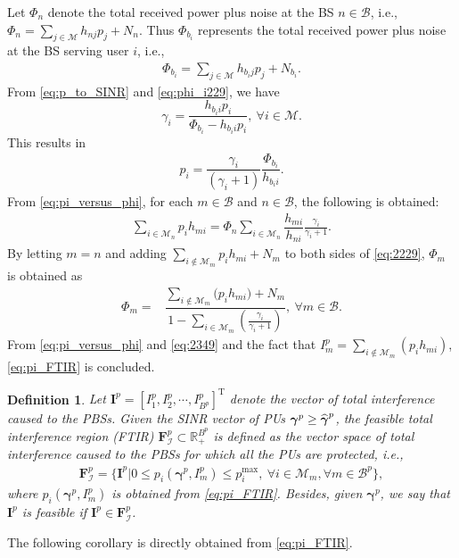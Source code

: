 \documentclass[journal,twoside]{IEEEtran}
\newcommand{\B}{\mathcal{B}}
\newcommand{\M}{\mathcal{M}}
\newcommand{\gammai}{\gamma_i}
\newcommand{\gammahatbold}{\widehat{\mbox{\boldmath{$\gamma$}}}}
\newcommand{\gammabold}{\boldsymbol{\gamma}}
\newcommand{\hup}[2]{h_{#1 #2}}
\newcommand{\Nup}[1]{N_{#1}}
\newtheorem {definition}{Definition}
\begin{document}
	\begin{IEEEproof}
		Let $\Phi_{n}$ denote the total received power plus noise at the BS $n\in\B$, i.e., $\Phi_{n}=\sum_{j\in\M}{\!\hup{n}{j} p_j} \!  + \Nup{n}$. Thus $\Phi_{b_i}$ represents the total received power plus noise at the BS serving user $i$, i.e., 
		\begin{align}
		\label{eq:phi_i229}
			\Phi_{b_i}=\sum\limits_{j\in\M}{\!\!\hup{b_i}{j} p_j} \!  + \Nup{b_i}.
		\end{align}
From {\eqref{eq:p_to_SINR}} and {\eqref{eq:phi_i229}}, we have 
		\begin{equation}
		\label{eq:1129}
			\gammai=
			\dfrac	{\hup{b_i}{i} p_i}
					{\Phi_{b_i}-\hup{b_i}{i} p_i}, \ \forall i\in\M.
		\end{equation}
		This results in
		\begin{align}
		\label{eq:pi_versus_phi}
			p_i= \dfrac{\gammai}{(\gammai+1)} \dfrac{\Phi_{b_i}}{\hup{b_i}{i}}. \end{align}
		From {\eqref{eq:pi_versus_phi}}, for each $m\in\B$ and $n\in\B$, the following is obtained:
		\begin{align}
		\label{eq:2229}
\sum\limits_{i\in\M_{n}}{p_i \hup{m}{i}} = \Phi_{n} \sum\limits_{i\in\M_{n}}{\dfrac{\hup{m}{i}}{\hup{n}{i}}\frac{\gamma_i}{\gamma_i+1}}.
		\end{align}
		By letting $m=n$ and adding $\sum_{i\notin\M_{m}}{\!p_i \hup{m}{i}}+N_{m}$ to both sides of {\eqref{eq:2229}}, $\Phi_{m}$ is obtained as
		\begin{align}
		\label{eq:2349}
			\Phi_{m}
			= & \dfrac{\sum\limits_{i\notin\M_m} {\!\!\!\big(p_i \hup{m}{i} \big)} + N_{m}} {1- \! \sum\limits_{i\in\M_m}\!\!\! \left(\frac{\gamma_i}{\gamma_i+1}\right)}, \ \forall m\in\B.
		\end{align}
		From \eqref{eq:pi_versus_phi} and \eqref{eq:2349} and the fact that $I^p_m=\sum_{i\notin\M_m} {\!(p_i \hup{m}{i} )}$, \eqref{eq:pi_FTIR} is concluded.
	\end{IEEEproof}
	\begin{definition}
	\label{def:total_feasible_interference}
		Let $\mathbf{I}^{p}=[I^{p}_1,I^{p}_2,\cdots,I^{p}_{B^p}]^{\mathrm{T}}$ denote the vector of total interference  caused to the PBSs. Given the SINR vector of PUs $\gammabold^{p}\geq \gammahatbold^{p}$, the feasible total interference region (FTIR) $\mathbf{F}^{p}_{\mathbf{\mathcal{I}}}\subset \mathbb{R}_{+}^{B^p}$ is defined as the vector space of total interference caused to the PBSs for which all the PUs are protected, i.e., 
		\begin{align}
		\label{eq:320}
			\mathbf{F}^{p}_{\mathbf{\mathcal{I}}}=\{\mathbf{I}^{p} | 0 \leq p_i\left(\! \gammabold^p,{I}^{p}_{m} \! \right) \! \leq \! p_i^{\mathrm{max}}, \ \forall i\in\M_m, \forall m\in\B^p \},
		\end{align}
		where $p_i\left( \gammabold^p,{I}^{p}_{m} \right)$ is obtained from \eqref{eq:pi_FTIR}. Besides, given $\gammabold^p$, we say that $\mathbf{I}^{p}$ is feasible if $\mathbf{I}^{p}\in \mathbf{F}_{\mathcal{I}}^{p}$.
	\end{definition}
	The following corollary is directly obtained from \eqref{eq:pi_FTIR}.
\end{document}

